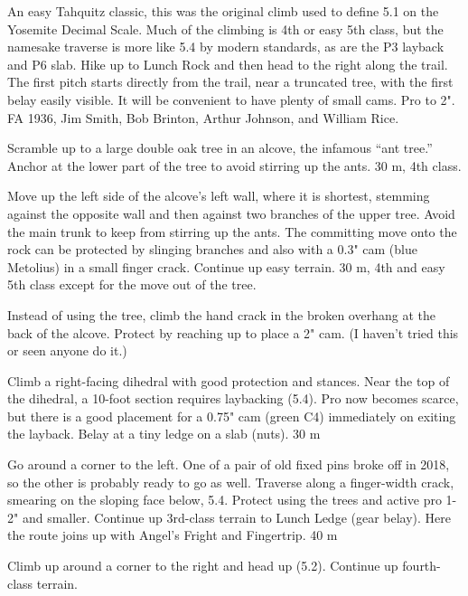 \documentclass{tahquitz}
\begin{document}


An easy Tahquitz classic, this was the original climb used to define
5.1 on the Yosemite Decimal Scale. Much of the
climbing is 4th or easy 5th class, but the namesake traverse is more
like 5.4 by modern standards, as are the P3 layback and P6 slab.
Hike up to Lunch Rock and then head to the right along the
trail. The first pitch starts directly from the trail, near a 
truncated tree, with the first belay easily visible. It will be
convenient to have plenty of small cams. Pro to 2". FA
1936, Jim Smith, Bob Brinton, Arthur Johnson, and William Rice.

 Scramble up to a large double oak tree in an alcove, the infamous
``ant tree.'' Anchor at the lower part of the tree to avoid stirring up
the ants. 30 m, 4th class.

 Move up the left side of the alcove's left wall, where it is
shortest, stemming against the opposite wall and then against two  branches
of the upper tree. Avoid the main trunk to keep from stirring up the ants.
The committing move onto the rock can be protected by slinging branches and
also with a 0.3" cam (blue Metolius) in a small
finger crack. Continue up easy terrain. 30 m, 4th and easy 5th class
except for the move out of the tree.

 Instead of using the tree, climb the hand crack in the broken overhang at
the back of the alcove. Protect by reaching up to place
a 2" cam. (I haven't tried this or seen anyone do it.)

 Climb a right-facing dihedral with good protection and
stances. Near the top of the dihedral, a 10-foot section requires laybacking (5.4).
Pro now becomes scarce, but there is a good placement for a 0.75" cam (green C4) immediately
on exiting the layback.
Belay at a tiny ledge on a slab (nuts). 30 m

 Go around a corner to the left. One of a pair of old fixed pins
broke off in 2018, so the other is probably ready to go as well.
Traverse along a finger-width crack,
smearing on the sloping face below, 5.4. Protect using the trees and
active pro 1-2" and smaller. Continue up 3rd-class terrain to Lunch Ledge (gear
belay). Here the route joins up with Angel's Fright and Fingertrip. 40 m


 Climb up around a corner to the right and head up (5.2).
Continue up fourth-class terrain.
\end{document}

